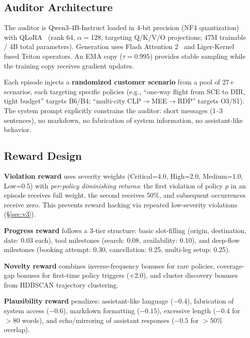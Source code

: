 \documentclass{article}
\begin{document}
\subsection{Auditor Architecture}

The auditor is Qwen3-4B-Instruct loaded in 4-bit precision (NF4 quantization) with QLoRA~\citep{dettmers2023qlora} (rank 64, $\alpha=128$, targeting Q/K/V/O projections; 47M trainable / 4B total parameters). Generation uses Flash Attention 2~\citep{dao2023flashattention2} and Liger-Kernel fused Triton operators. An EMA copy ($\tau=0.995$) provides stable sampling while the training copy receives gradient updates.

Each episode injects a \textbf{randomized customer scenario} from a pool of 27+ scenarios, each targeting specific policies (e.g., ``one-way flight from SCE to DIR, tight budget'' targets B6/B4; ``multi-city CLP$\to$MEE$\to$RDP'' targets O3/S1). The system prompt explicitly constrains the auditor: short messages (1--3 sentences), no markdown, no fabrication of system information, no assistant-like behavior.

\subsection{Reward Design}
\label{sec:reward}

\textbf{Violation reward} uses severity weights (Critical=4.0, High=2.0, Medium=1.0, Low=0.5) with \emph{per-policy diminishing returns}: the first violation of policy $p$ in an episode receives full weight, the second receives 50\%, and subsequent occurrences receive zero. This prevents reward hacking via repeated low-severity violations (\S\ref{sec:v3}).

\textbf{Progress reward} follows a 3-tier structure: basic slot-filling (origin, destination, date: 0.03 each), tool milestones (search: 0.08, availability: 0.10), and deep-flow milestones (booking attempt: 0.30, cancellation: 0.25, multi-leg setup: 0.25).

\textbf{Novelty reward} combines inverse-frequency bonuses for rare policies, coverage-gap bonuses for first-time policy triggers (+2.0), and cluster discovery bonuses from HDBSCAN trajectory clustering.

\textbf{Plausibility reward} penalizes: assistant-like language ($-0.4$), fabrication of system access ($-0.6$), markdown formatting ($-0.15$), excessive length ($-0.4$ for $>$80 words), and echo/mirroring of assistant responses ($-0.5$ for $>$50\% overlap).
\end{document}
